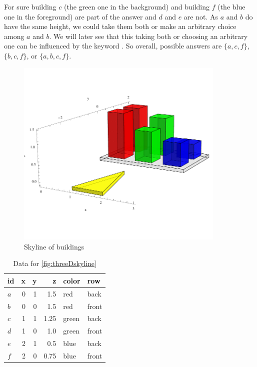 \begin{example}\label{ex:touchsky}
For sure building $c$ (the green one in the background) and building $f$
(the blue one in the foreground) are part of the answer and $d$ and $e$
are not.  As $a$ and $b$ do have the same height, we could take them
both or make an arbitrary choice among $a$ and $b$.  We will later
see that this taking both or choosing an arbitrary one can be
influenced by the keyword . So overall, possible
answers are $\{a, c, f\}$, $\{b, c, f\}$, or $\{a, b, c, f\}$.
\end{example}

\begin{figure}[htbp]
\centering
\includegraphics[width=100mm]{plots-misc/PlotSkyline3D}%
\caption{Skyline of buildings}%
\label{fig:threeDskyline}%
\end{figure}

\begin{table}[htbp]
\centering
\begin{tabular}{l|rrrll}
id & x & y & z & color & row\\
\hline
$a$ & 0 & 1 & 1.5 & red & back \\
$b$ & 0 & 0 & 1.5 & red & front \\
$c$ & 1 & 1 & 1.25 & green & back \\
$d$ & 1 & 0 & 1.0 & green & front \\
$e$ & 2 & 1 & 0.5 & blue & back \\
$f$ & 2 & 0 & 0.75 & blue & front
\end{tabular}
\caption{Data for \autoref{fig:threeDskyline}}
\label{tab:threeDskyline}
\end{table}

